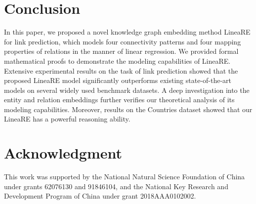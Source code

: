 \documentclass[conference]{IEEEtran}
\begin{document}
\section{Conclusion}
In this paper, we proposed a novel knowledge graph embedding method LineaRE for link prediction, which models four connectivity patterns and four mapping properties of relations  in the manner of linear regression. We provided formal mathematical proofs to demonstrate the modeling capabilities of LineaRE. Extensive experimental results on the task of link prediction showed that the proposed LineaRE model significantly outperforms existing state-of-the-art models on several widely used benchmark datasets. A deep investigation into the entity and relation embeddings further verifies our theoretical analysis of its modeling capabilities. Moreover, results on the Countries dataset showed that our LineaRE has a powerful reasoning ability.

\section*{Acknowledgment}
This work was supported by the National Natural Science Foundation of China under grants 62076130 and 91846104, and the National Key Research and Development Program of China under grant 2018AAA0102002.



\end{document}
